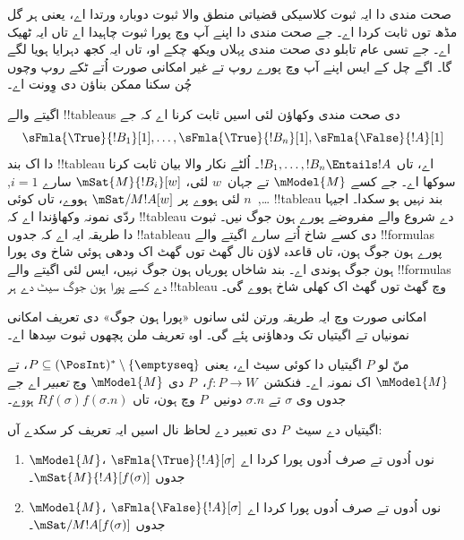 \documentclass[../../../include/open-logic-section]{subfiles}
\begin{document}


\begin{editorial}
  صحت مندی دا ایہ ثبوت کلاسیکی قضیاتی منطق والا ثبوت دوبارہ ورتدا اے،
  یعنی ہر گل مڈھ توں ثابت کردا اے۔ جے صحت مندی دا اپنے آپ وچ پورا
  ثبوت چاہیدا اے تاں ایہ ٹھیک اے۔ جے تسی عام تابلو دی صحت مندی پہلاں
  ویکھ چکے او، تاں ایہ کجھ دہرایا ہویا لگے گا۔ اگے چل کے ایس اپنے آپ
  وچ پورے روپ تے غیر امکانی صورت اُتے ٹکے روپ وچوں چُن سکنا ممکن
  بناؤن دی وِونت اے۔
\end{editorial}

\begin{explain}
  اگیتے والے !!{tableau}s دی صحت مندی وکھاؤن لئی اسیں ثابت کرنا اے کہ جے
  \[
  \sFmla{\True}{!B_1}[1], \dots, \sFmla{\True}{!B_n}[1], \sFmla{\False}{!A}[1]
  \]
  دا اک بند !!{tableau} اے، تاں $!B_1, \dots, !B_n \Entails !A$۔
  اُلٹے نکار والا بیان ثابت کرنا سوکھا اے۔ جے کسے $\mModel{M}$ تے
  جہان~$w$ لئی، $\mSat{M}{!B_i}[w]$ سارے $i=1$, \dots,~$n$ لئی ہووے
  پر $\mSat/{M}{!A}[w]$ ہووے، تاں کوئی !!{tableau} بند نہیں ہو سکدا۔
  اجیہا ردّی نمونہ وکھاؤندا اے کہ !!{tableau} دے شروع والے مفروضے پورے
  ہون جوگ نیں۔ ثبوت دا طریقہ ایہ اے کہ جدوں !!a{tableau} دی کسے شاخ
  اُتے سارے اگیتے والے !!{formula}s پورے ہون جوگ ہون، تاں قاعدہ لاؤن نال
  گھٹ توں گھٹ اک ودھی ہوئی شاخ وی پورا ہون جوگ ہوندی اے۔ بند شاخاں
  پوریاں ہون جوگ نہیں، ایس لئی اگیتے والے !!{formula}s دے کسے پورا ہون
  جوگ سیٹ دے ہر !!{tableau} وچ گھٹ توں گھٹ اک کھلی شاخ ہووے گی۔

امکانی صورت وچ ایہ طریقہ ورتن لئی سانوں «پورا ہون جوگ» دی تعریف
  امکانی نمونیاں تے اگیتیاں تک ودھاؤنی پئے گی۔ اوہ تعریف ملن پچھوں
  ثبوت سِدھا اے۔
\end{explain}

\begin{defn}
  منّ لو $P$ اگیتیاں دا کوئی سیٹ اے، یعنی $P \subseteq (\PosInt)^*
  \setminus \{\emptyseq\}$، تے $\mModel{M}$ اک نمونہ اے۔
  فنکشن~$f\colon P \to W$،~$P$ دی $\mModel{M}$ وچ \emph{تعبیر} اے جے
  جدوں وی $\sigma$ تے $\sigma.n$ دونیں~$P$ وچ ہون، تاں
  $Rf(\sigma)f(\sigma.n)$ ہووے۔

اگیتیاں دے سیٹ~$P$ دی تعبیر دے لحاظ نال اسیں ایہ تعریف کر سکدے آں:
  \begin{enumerate}
  \item $\mModel{M}$، $\sFmla{\True}{!A}[\sigma]$ نوں اُدوں تے صرف اُدوں
    پورا کردا اے جدوں $\mSat{M}{!A}[f(\sigma)]$۔
  \item $\mModel{M}$، $\sFmla{\False}{!A}[\sigma]$ نوں اُدوں تے صرف اُدوں
    پورا کردا اے جدوں $\mSat/{M}{!A}[f(\sigma)]$۔
  \end{enumerate}
\end{defn}
\end{document}
